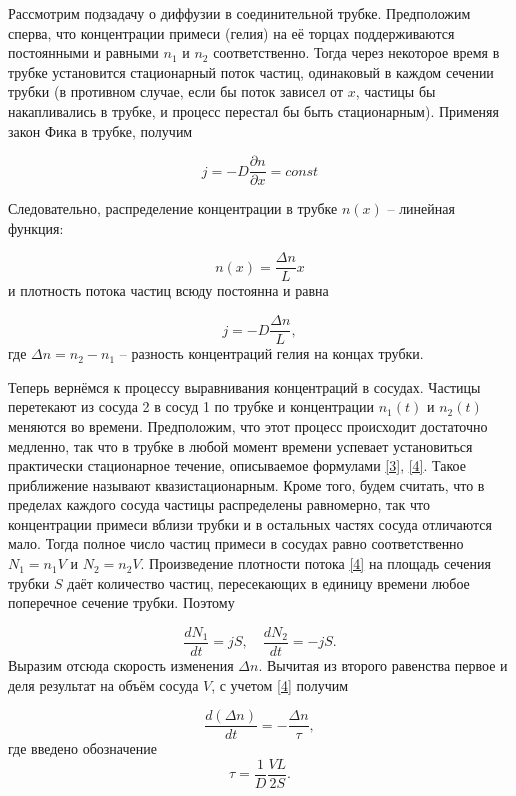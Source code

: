 \documentclass[a4paper,12pt]{article} %
\begin{document}
Рассмотрим подзадачу о диффузии в соединительной трубке. Предположим сперва, что концентрации примеси (гелия) на её торцах поддерживаются постоянными и равными $ n_1 $ и $ n_2 $ соответственно. Тогда через некоторое время в трубке установится стационарный поток частиц, одинаковый в каждом сечении трубки (в противном случае, если бы поток зависел от $ x $, частицы бы накапливались в трубке, и процесс перестал бы быть стационарным). Применяя закон Фика в трубке, получим

\[ j=-D\frac{\partial n}{\partial x} = const \]

Следовательно, распределение концентрации в трубке $ n(x) $ -- линейная
функция:

\begin{equation}\label{3}
n(x) = \frac{\Delta n}{L} x
\end{equation}
и плотность потока частиц всюду постоянна и равна

\begin{equation}\label{4}
j=-D\frac{\Delta n}{L},
\end{equation}
где $ \Delta n = n_2-n_1 $ -- разность концентраций гелия на концах трубки.

Теперь вернёмся к процессу выравнивания концентраций в сосудах. Частицы перетекают из сосуда 2 в сосуд 1 по трубке и концентрации $ n_1(t) $ и $ n_2(t) $ меняются во времени. Предположим, что этот процесс происходит достаточно медленно, так что в трубке в любой момент времени успевает установиться практически стационарное течение, описываемое формулами \eqref{3}, \eqref{4}. Такое приближение называют квазистационарным. Кроме того, будем считать, что в пределах каждого сосуда частицы распределены равномерно, так что концентрации примеси вблизи трубки и в остальных частях сосуда отличаются мало. Тогда полное число частиц примеси в сосудах равно соответственно $ N_1=n_1V $ и $ N_2=n_2V $. Произведение плотности потока \eqref{4} на площадь сечения трубки $ S $ даёт количество частиц, пересекающих в единицу времени любое поперечное сечение трубки. Поэтому

\begin{equation}\label{5}
\frac{dN_1}{dt}=jS, \quad \frac{dN_2}{dt}=-jS.
\end{equation}
Выразим отсюда скорость изменения $ \Delta n $. Вычитая из второго равенства первое и деля результат на объём сосуда $ V $, с учетом \eqref{4} получим

\begin{equation}\label{6}
\frac{d(\Delta n)}{dt}=-\frac{\Delta n}{\tau},
\end{equation}
где введено обозначение
\begin{equation}\label{7}
\tau=\frac{1}{D}\frac{VL}{2S}.
\end{equation}
\end{document}
